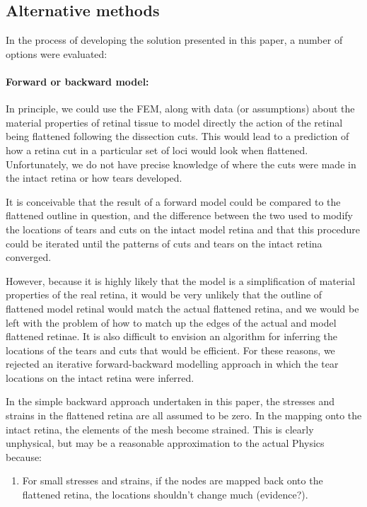 \documentclass[10pt]{article}
\begin{document}
\subsection*{Alternative methods}
\label{fold-sphere:sec:alternative-methods}

In the process of developing the solution presented in this paper, a
number of options were evaluated:

\paragraph{Forward or backward model:} 

In principle, we could use the FEM, along with data (or assumptions)
about the material properties of retinal tissue to model directly the
action of the retinal being flattened following the dissection
cuts. This would lead to a prediction of how a retina cut in a
particular set of loci would look when flattened. Unfortunately, we do
not have precise knowledge of where the cuts were made in the intact
retina or how tears developed.

It is conceivable that the result of a forward model could be compared
to the flattened outline in question, and the difference between the
two used to modify the locations of tears and cuts on the intact model
retina and that this procedure could be iterated until the patterns of
cuts and tears on the intact retina converged.

However, because it is highly likely that the model is a
simplification of material properties of the real retina, it would be
very unlikely that the outline of flattened model retinal would match
the actual flattened retina, and we would be left with the problem of
how to match up the edges of the actual and model flattened
retinae. It is also difficult to envision an algorithm for inferring
the locations of the tears and cuts that would be efficient. For these
reasons, we rejected an iterative forward-backward modelling approach
in which the tear locations on the intact retina were inferred.

In the simple backward approach undertaken in this paper, the stresses
and strains in the flattened retina are all assumed to be zero. In the
mapping onto the intact retina, the elements of the mesh become
strained. This is clearly unphysical, but may be a reasonable
approximation to the actual Physics because:
\begin{enumerate}
\item For small stresses and strains, if the nodes are mapped back
  onto the flattened retina, the locations shouldn't change much
  (evidence?).
\end{enumerate}
\end{document}
